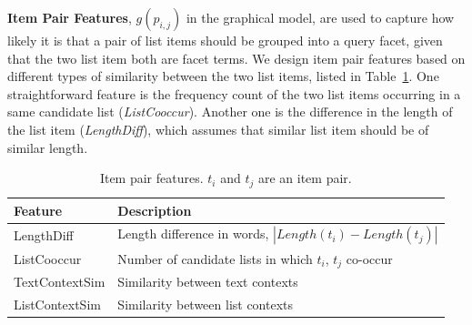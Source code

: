 \textbf{Item Pair Features}, $g(p_{i,j})$ in the graphical model, are used to capture how likely it is that a pair of list items should be grouped into a query facet, given that the two list item both are facet terms. We design item pair features based on different types of similarity between the two list items,  listed in Table~\ref{tab:facet-pfeature}. One straightforward feature is the frequency count of the two list items occurring in a same candidate list (\textit{ListCooccur}). Another one is the difference in the length of the list item (\textit{LengthDiff}), which assumes that similar list item should be of similar length. 

\begin{table}[h!]
\centering
\caption{Item pair features. $t_i$ and $t_j$ are an item pair.}
\label{tab:facet-pfeature}
\begin{tabular}{ |l|l| } \hline
  Feature  & Description \\ \hline
  LengthDiff  & Length difference in words, $|Length(t_i) - Length(t_j)|$ \\
  ListCooccur & Number of candidate lists in which $t_i$, $t_j$ co-occur\\
  TextContextSim & Similarity between text contexts\\
  ListContextSim & Similarity between list contexts\\
\hline
\end{tabular}
\end{table}


